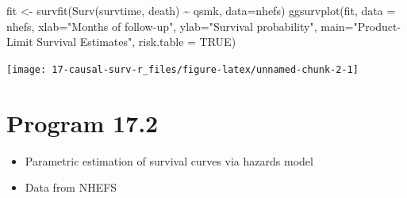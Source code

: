 \documentclass[
  10pt,
  a4paper,
]{book}
\newenvironment{Shaded}{\begin{snugshade}}{\end{snugshade}}
\newcommand{\AttributeTok}[1]{\textcolor[rgb]{0.40,0.45,0.13}{#1}}
\newcommand{\ConstantTok}[1]{\textcolor[rgb]{0.56,0.35,0.01}{#1}}
\newcommand{\FunctionTok}[1]{\textcolor[rgb]{0.28,0.35,0.67}{#1}}
\newcommand{\NormalTok}[1]{\textcolor[rgb]{0.00,0.46,0.62}{#1}}
\newcommand{\OtherTok}[1]{\textcolor[rgb]{0.00,0.46,0.62}{#1}}
\newcommand{\SpecialCharTok}[1]{\textcolor[rgb]{0.37,0.37,0.37}{#1}}
\newcommand{\StringTok}[1]{\textcolor[rgb]{0.13,0.47,0.30}{#1}}
\providecommand{\tightlist}{%
  \setlength{\itemsep}{0pt}\setlength{\parskip}{0pt}}
\begin{document}
\begin{Shaded}
\begin{Highlighting}[]
\NormalTok{fit }\OtherTok{\textless{}{-}} \FunctionTok{survfit}\NormalTok{(}\FunctionTok{Surv}\NormalTok{(survtime, death) }\SpecialCharTok{\textasciitilde{}}\NormalTok{ qsmk, }\AttributeTok{data=}\NormalTok{nhefs)}
\FunctionTok{ggsurvplot}\NormalTok{(fit, }\AttributeTok{data =}\NormalTok{ nhefs, }\AttributeTok{xlab=}\StringTok{"Months of follow{-}up"}\NormalTok{,}
           \AttributeTok{ylab=}\StringTok{"Survival probability"}\NormalTok{,}
           \AttributeTok{main=}\StringTok{"Product{-}Limit Survival Estimates"}\NormalTok{, }\AttributeTok{risk.table =} \ConstantTok{TRUE}\NormalTok{)}
\end{Highlighting}
\end{Shaded}

\begin{center}\texttt{[image: 17-causal-surv-r\_files/figure-latex/unnamed-chunk-2-1]} \end{center}

\section{Program 17.2}\label{program-17.2}

\begin{itemize}
\tightlist
\item
  Parametric estimation of survival curves via hazards model
\item
  Data from NHEFS
\end{itemize}
\end{document}
